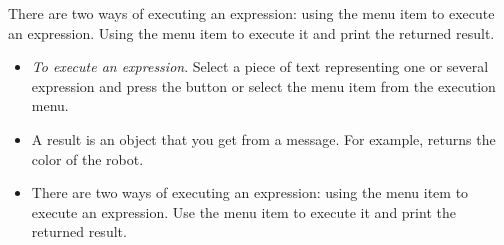 \begin{largecadre}{There are two ways of executing an expression: using the  menu item to execute an expression. Using the    menu item to  execute it and print the returned result.}
\end{largecadre}




\summa
\begin{itemize}
\item \emph{To execute an expression}. Select a piece of text representing one or several expression and press the  button or select the menu item
 from the execution menu.

\item A result is an object that you get from a message. For example,  returns the color of the robot.

\item There are two ways of executing an expression: using the  menu item to execute an expression. Use the    menu item to  execute it and print the returned result.

\end{itemize}


\ifx\wholebook\relax\else\fi



